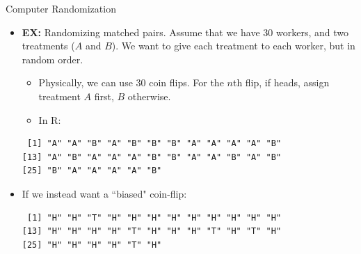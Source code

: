 \begin{frame}{Computer Randomization}
\begin{itemize}
  \end{itemize}
  
  \framebreak
  
  \begin{itemize}
    \item \textbf{EX:} Randomizing matched pairs. Assume that we have 30 workers, and two treatments ($A$ and $B$). We want to give each treatment to each worker, but in random order.
    \begin{itemize}
      \item Physically, we can use 30 coin flips. For the $n$th flip, if heads, assign treatment $A$ first, $B$ otherwise.
      \item In R:
    \end{itemize}
    
    
\begin{knitrout}\small
{}\color{fgcolor}\begin{kframe}
\begin{alltt}
\hldef{(}\hldef{)}
\hldef{(}\hldef{(}\hldef{,} \hldef{),}  \hldef{=} \hldef{,}  \hldef{=} \hldef{)}
\end{alltt}
\begin{verbatim}
 [1] "A" "A" "B" "A" "B" "B" "B" "A" "A" "A" "A" "B"
[13] "A" "B" "A" "A" "A" "B" "B" "A" "A" "B" "A" "B"
[25] "B" "A" "A" "A" "A" "B"
\end{verbatim}
\end{kframe}
\end{knitrout}
  
  \framebreak
  
  \item If we instead want a ``biased" coin-flip:
  
\begin{knitrout}\small
{}\color{fgcolor}\begin{kframe}
\begin{alltt}
\hldef{(}\hldef{)}
\hldef{(}
  \hldef{(}\hldef{,} \hldef{),}  \hldef{=} \hldef{,}
   \hldef{=} \hldef{,}  \hldef{=} \hldef{(}\hldef{,} \hldef{)}
\hldef{)}
\end{alltt}
\begin{verbatim}
 [1] "H" "H" "T" "H" "H" "H" "H" "H" "H" "H" "H" "H"
[13] "H" "H" "H" "H" "T" "H" "H" "H" "T" "H" "T" "H"
[25] "H" "H" "H" "H" "T" "H"
\end{verbatim}
\end{kframe}
\end{knitrout}
  
  
  \end{itemize}
  
\end{frame}

